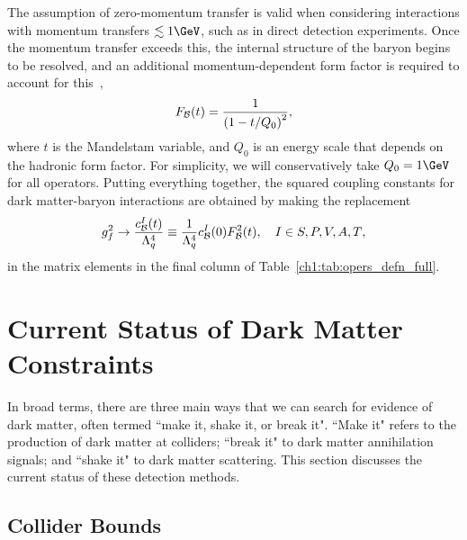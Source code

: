 The assumption of zero-momentum transfer is valid when considering interactions with momentum transfers $\lesssim 1\GeV$, such as in direct detection experiments. Once the momentum transfer exceeds this, the internal structure of the baryon begins to be resolved, and an additional momentum-dependent form factor is required to account for this~\cite{_ElectromagneticStructureNucleon},
\begin{equation}
    F_{\cal B}(t) = \frac{1}{\left( 1 - t/Q_0\right)^2},
\end{equation}
where $t$ is the Mandelstam variable, and $Q_0$ is an energy scale that depends on the hadronic form factor. For simplicity, we will conservatively take $Q_0 = 1 \GeV$ for all operators.
Putting everything together, the squared coupling constants for dark matter-baryon interactions are obtained by making the replacement
\begin{equation}
    g_f^2 \rightarrow \frac{c^I_{\cal B}(t)}{\Lambda_q^4} \equiv \frac{1}{\Lambda_q^4}c_{\cal B}^I(0)F^2_{\cal B}(t),\quad I\in {S, P, V, A, T},
\end{equation}
in the matrix elements in the final column of Table~\ref{ch1:tab:opers_defn_full}.



\section{Current Status of Dark Matter Constraints}

In broad terms, there are three main ways that we can search for evidence of dark matter, often termed ``make it, shake it, or break it". ``Make it" refers to the production of dark matter at colliders; ``break it" to dark matter annihilation signals; and ``shake it" to dark matter scattering. 
This section discusses the current status of these detection methods. 


\subsection{Collider Bounds}

